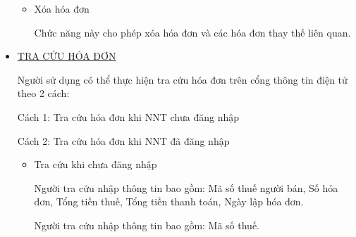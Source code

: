 \begin{itemize}
\begin{itemize}
              \item Xóa hóa đơn

                    Chức năng này cho phép xóa hóa đơn và các hóa đơn thay thế liên quan.

          \end{itemize}

    \item \underline{TRA CỨU HÓA ĐƠN}

          Người sử dụng có thể thực hiện tra cứu hóa đơn trên cổng thông tin điện tử theo 2 cách:

          Cách 1: Tra cứu hóa đơn khi NNT chưa đăng nhập

          Cách 2: Tra cứu hóa đơn khi NNT đã đăng nhập

          \begin{itemize}

              \item Tra cứu khi chưa đăng nhập


                    Người tra cứu nhập thông tin bao gồm: Mã số thuế người bán, Số hóa đơn, Tổng tiền thuế, Tổng tiền thanh toán, Ngày lập hóa đơn.






                    Người tra cứu nhập thông tin bao gồm: Mã số thuế.




\end{itemize}
\end{itemize}
